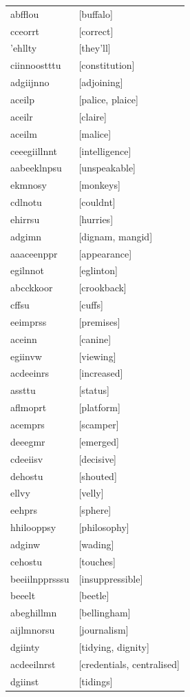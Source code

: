 \documentclass{article}
\begin{document}
\begin{tabular}{ll}
abfflou & [buffalo] \\
cceorrt & [correct] \\
'ehllty & [they'll] \\
ciinnoostttu & [constitution] \\
adgiijnno & [adjoining] \\
aceilp & [palice, plaice] \\
aceilr & [claire] \\
aceilm & [malice] \\
ceeegiillnnt & [intelligence] \\
aabeeklnpsu & [unspeakable] \\
ekmnosy & [monkeys] \\
cdlnotu & [couldnt] \\
ehirrsu & [hurries] \\
adgimn & [dignam, mangid] \\
aaaceenppr & [appearance] \\
egilnnot & [eglinton] \\
abcckkoor & [crookback] \\
cffsu & [cuffs] \\
eeimprss & [premises] \\
aceinn & [canine] \\
egiinvw & [viewing] \\
acdeeinrs & [increased] \\
assttu & [status] \\
aflmoprt & [platform] \\
acemprs & [scamper] \\
deeegmr & [emerged] \\
cdeeiisv & [decisive] \\
dehostu & [shouted] \\
ellvy & [velly] \\
eehprs & [sphere] \\
hhilooppsy & [philosophy] \\
adginw & [wading] \\
cehostu & [touches] \\
beeiilnpprsssu & [insuppressible] \\
beeelt & [beetle] \\
abeghillmn & [bellingham] \\
aijlmnorsu & [journalism] \\
dgiinty & [tidying, dignity] \\
acdeeilnrst & [credentials, centralised] \\
dgiinst & [tidings] \\

\end{tabular}
\end{document}
